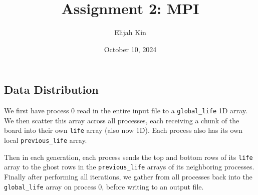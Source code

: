 \documentclass{article}
\title{Assignment 2: MPI}
\author{Elijah Kin}
\date{October 10, 2024}
\begin{document}
  \maketitle

  \subsection*{Data Distribution}
  We first have process 0 read in the entire input file to a \texttt{global\_life} 1D array. We then scatter this array across all processes, each receiving a chunk of the board into their own \texttt{life} array (also now 1D). Each process also has its own local \texttt{previous\_life} array.

  Then in each generation, each process sends the top and bottom rows of its \texttt{life} array to the ghost rows in the \texttt{previous\_life} arrays of its neighboring processes. Finally after performing all iterations, we gather from all processes back into the \texttt{global\_life} array on process 0, before writing to an output file.
\end{document}

